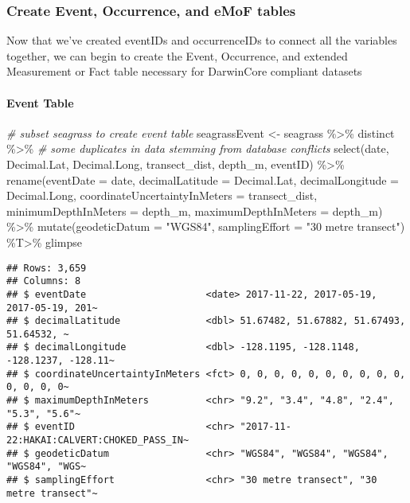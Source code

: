 \documentclass[
]{book}
\newenvironment{Shaded}{\begin{snugshade}}{\end{snugshade}}
\newcommand{\AttributeTok}[1]{\textcolor[rgb]{0.77,0.63,0.00}{#1}}
\newcommand{\CommentTok}[1]{\textcolor[rgb]{0.56,0.35,0.01}{\textit{#1}}}
\newcommand{\FunctionTok}[1]{\textcolor[rgb]{0.00,0.00,0.00}{#1}}
\newcommand{\NormalTok}[1]{#1}
\newcommand{\OtherTok}[1]{\textcolor[rgb]{0.56,0.35,0.01}{#1}}
\newcommand{\SpecialCharTok}[1]{\textcolor[rgb]{0.00,0.00,0.00}{#1}}
\newcommand{\StringTok}[1]{\textcolor[rgb]{0.31,0.60,0.02}{#1}}
\begin{document}
\hypertarget{create-event-occurrence-and-emof-tables}{%
\subsubsection{Create Event, Occurrence, and eMoF tables}\label{create-event-occurrence-and-emof-tables}}

Now that we've created eventIDs and occurrenceIDs to connect all the
variables together, we can begin to create the Event, Occurrence,
and extended Measurement or Fact table necessary for DarwinCore
compliant datasets

\hypertarget{event-table}{%
\paragraph{Event Table}\label{event-table}}

\begin{Shaded}
\begin{Highlighting}[]
\CommentTok{\# subset seagrass to create event table}
\NormalTok{seagrassEvent }\OtherTok{\textless{}{-}}
\NormalTok{  seagrass }\SpecialCharTok{\%\textgreater{}\%}
\NormalTok{  distinct }\SpecialCharTok{\%\textgreater{}\%}  \CommentTok{\# some duplicates in data stemming from database conflicts}
  \FunctionTok{select}\NormalTok{(date,}
\NormalTok{         Decimal.Lat, Decimal.Long, transect\_dist,}
\NormalTok{         depth\_m, eventID) }\SpecialCharTok{\%\textgreater{}\%}
  \FunctionTok{rename}\NormalTok{(}\AttributeTok{eventDate                     =}\NormalTok{ date,}
         \AttributeTok{decimalLatitude               =}\NormalTok{ Decimal.Lat,}
         \AttributeTok{decimalLongitude              =}\NormalTok{ Decimal.Long,}
         \AttributeTok{coordinateUncertaintyInMeters =}\NormalTok{ transect\_dist,}
         \AttributeTok{minimumDepthInMeters          =}\NormalTok{ depth\_m,}
         \AttributeTok{maximumDepthInMeters          =}\NormalTok{ depth\_m) }\SpecialCharTok{\%\textgreater{}\%}
  \FunctionTok{mutate}\NormalTok{(}\AttributeTok{geodeticDatum  =} \StringTok{"WGS84"}\NormalTok{,}
         \AttributeTok{samplingEffort =} \StringTok{"30 metre transect"}\NormalTok{) }\SpecialCharTok{\%T\textgreater{}\%}\NormalTok{ glimpse}
\end{Highlighting}
\end{Shaded}

\begin{verbatim}
## Rows: 3,659
## Columns: 8
## $ eventDate                     <date> 2017-11-22, 2017-05-19, 2017-05-19, 201~
## $ decimalLatitude               <dbl> 51.67482, 51.67882, 51.67493, 51.64532, ~
## $ decimalLongitude              <dbl> -128.1195, -128.1148, -128.1237, -128.11~
## $ coordinateUncertaintyInMeters <fct> 0, 0, 0, 0, 0, 0, 0, 0, 0, 0, 0, 0, 0, 0~
## $ maximumDepthInMeters          <chr> "9.2", "3.4", "4.8", "2.4", "5.3", "5.6"~
## $ eventID                       <chr> "2017-11-22:HAKAI:CALVERT:CHOKED_PASS_IN~
## $ geodeticDatum                 <chr> "WGS84", "WGS84", "WGS84", "WGS84", "WGS~
## $ samplingEffort                <chr> "30 metre transect", "30 metre transect"~
\end{verbatim}
\end{document}
